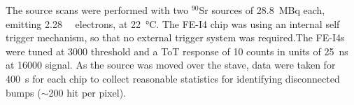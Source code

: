 The source scans were performed with two $^{90}$Sr sources of \SI{28.8}{\mega\becquerel} each, emitting \SI{2.28}{\mega\ev} electrons, at \SI{22}{\celsius}. The FE-I4 chip was using an internal self trigger mechanism, so that no external trigger system was required.The FE-I4s were tuned at \SI{3000}{\e} threshold and a ToT response of 10 counts in units of \SI{25}{\nano\second} at \SI{16000}{\e} signal. As the source was moved over the stave, data were taken for \SI{400}{\second} for each chip to collect reasonable statistics for identifying disconnected bumps ($\sim$200 hit per pixel).

%

